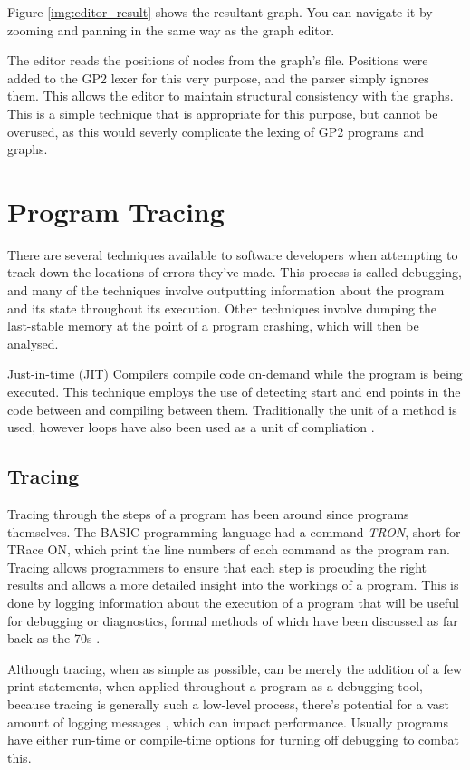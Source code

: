 \documentclass{UoYCSproject}
\begin{document}
Figure \ref{img:editor_result} shows the resultant graph. You can navigate it by zooming and panning in the same way as the graph editor.

The editor reads the positions of nodes from the graph's file. Positions were added to the GP2 lexer for this very purpose, and the parser simply ignores them. This allows the editor to maintain structural consistency with the graphs. This is a simple technique that is appropriate for this purpose, but cannot be overused, as this would severly complicate the lexing of GP2 programs and graphs.

\section{Program Tracing}
There are several techniques available to software developers when attempting to track down the locations of errors they've made. This process is called debugging, and many of the techniques involve outputting information about the program and its state throughout its execution. Other techniques involve dumping the last-stable memory at the point of a program crashing, which will then be analysed. 

Just-in-time (JIT) Compilers compile code on-demand while the program is being executed. This technique employs the use of detecting start and end points in the code between and compiling between them. Traditionally the unit of a method is used, however loops have also been used as a unit of compliation \cite{jit_trace}.

\subsection{Tracing}
Tracing through the steps of a program has been around since programs themselves. The BASIC programming language had a command \emph{TRON}, short for TRace ON, which print the line numbers of each command as the program ran. 
Tracing allows programmers to ensure that each step is procuding the right results and allows a more detailed insight into the workings of a program. This is done by logging information about the execution of a program that will be useful for debugging or diagnostics, formal methods of which have been discussed as far back as the 70s \cite{psych_debug, code_walkthroughs}.

Although tracing, when as simple as possible, can be merely the addition of a few print statements, when applied throughout a program as a debugging tool, because tracing is generally such a low-level process, there's potential for a vast amount of logging messages \cite{tracing_book}, which can impact performance. Usually programs have either run-time or compile-time options for turning off debugging to combat this.
\end{document}
